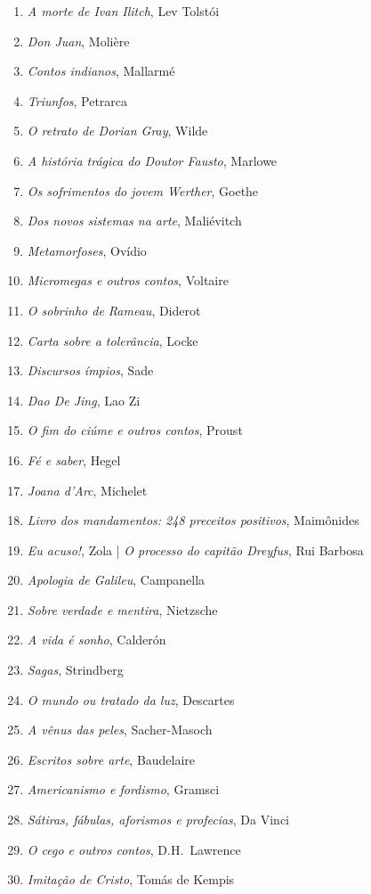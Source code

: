 \begin{enumerate}
\item \textit{A morte de Ivan Ilitch}, Lev Tolstói 
\item \textit{Don Juan}, Molière
\item \textit{Contos indianos}, Mallarmé
\item \textit{Triunfos}, Petrarca
\item \textit{O retrato de Dorian Gray}, Wilde
\item \textit{A história trágica do Doutor Fausto}, Marlowe
\item \textit{Os sofrimentos do jovem Werther}, Goethe
\item \textit{Dos novos sistemas na arte}, Maliévitch
\item \textit{Metamorfoses}, Ovídio
\item \textit{Micromegas e outros contos}, Voltaire
\item \textit{O sobrinho de Rameau}, Diderot
\item \textit{Carta sobre a tolerância}, Locke
\item \textit{Discursos ímpios}, Sade
\item \textit{Dao De Jing}, Lao Zi
\item \textit{O fim do ciúme e outros contos}, Proust
\item \textit{Fé e saber}, Hegel
\item \textit{Joana d'Arc}, Michelet
\item \textit{Livro dos mandamentos: 248 preceitos positivos}, Maimônides
\item \textit{Eu acuso!}, Zola | \textit{O processo do capitão Dreyfus}, Rui Barbosa
\item \textit{Apologia de Galileu}, Campanella 
\item \textit{Sobre verdade e mentira}, Nietzsche
\item \textit{A vida é sonho}, Calderón
\item \textit{Sagas}, Strindberg
\item \textit{O mundo ou tratado da luz}, Descartes
\item \textit{A vênus das peles}, Sacher{}-Masoch
\item \textit{Escritos sobre arte}, Baudelaire
\item \textit{Americanismo e fordismo}, Gramsci
\item \textit{Sátiras, fábulas, aforismos e profecias}, Da Vinci
\item \textit{O cego e outros contos}, D.H.~Lawrence
\item \textit{Imitação de Cristo}, Tomás de Kempis

\end{enumerate}
